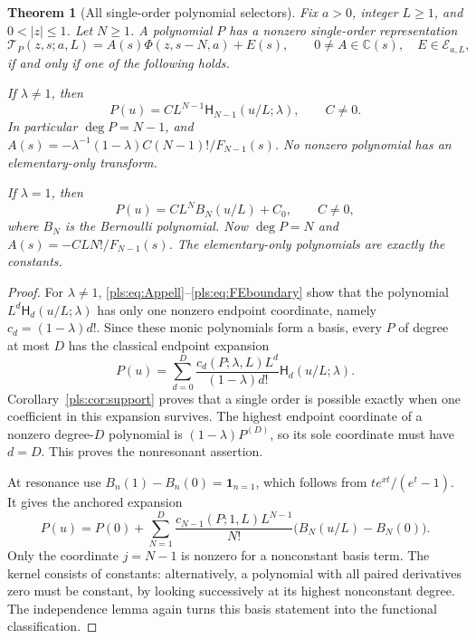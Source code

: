 \documentclass[11pt,letterpaper]{article}
\numberwithin{equation}{section}
\newtheorem{theorem}{Theorem}[section]
\theoremstyle{definition}
\theoremstyle{remark}\newtheorem{remark}[theorem]{Remark}
\newcommand{\C}{\mathbb C}\newcommand{\Q}{\mathbb Q}
\newcommand{\T}{\mathcal T}
\newcommand{\E}{\mathcal E}
\newcommand{\HFE}{\mathsf H}
\begin{document}
\begin{theorem}[All single-order polynomial selectors]
\label{pls:thm:classification}
Fix $a>0$, integer $L\ge1$, and $0<|z|\le1$. Let $N\ge1$.
A polynomial $P$ has a nonzero single-order representation
\begin{equation}\label{pls:eq:singledef}
 \T_P(z,s;a,L)=A(s)\Phi(z,s-N,a)+E(s),
 \qquad 0\ne A\in\C(s),\quad E\in\E_{a,L},
\end{equation}
if and only if one of the following holds.

If $\lambda\ne1$, then
\begin{equation}\label{pls:eq:nonresclass}
 P(u)=C L^{N-1}\HFE_{N-1}(u/L;\lambda),\qquad C\ne0.
\end{equation}
In particular $\deg P=N-1$, and
$A(s)=-\lambda^{-1}(1-\lambda)C(N-1)!/F_{N-1}(s)$.
No nonzero polynomial has an elementary-only transform.

If $\lambda=1$, then
\begin{equation}\label{pls:eq:resclass}
 P(u)=C L^N B_N(u/L)+C_0,\qquad C\ne0,
\end{equation}
where $B_N$ is the Bernoulli polynomial. Now $\deg P=N$ and
$A(s)=-CLN!/F_{N-1}(s)$. The elementary-only polynomials are
exactly the constants.
\end{theorem}
\begin{proof}
For $\lambda\ne1$, \eqref{pls:eq:Appell}--\eqref{pls:eq:FEboundary}
show that the polynomial $L^d\HFE_d(u/L;\lambda)$ has only one
nonzero endpoint coordinate, namely $c_d=(1-\lambda)d!$.
Since these monic polynomials form a basis, every $P$ of degree at
most $D$ has the classical endpoint expansion
\begin{equation}\label{pls:eq:FEbasis}
 P(u)=\sum_{d=0}^D
       \frac{c_d(P;\lambda,L)L^d}{(1-\lambda)d!}
                         \HFE_d(u/L;\lambda).
\end{equation}
Corollary~\ref{pls:cor:support} proves that a single order is
possible exactly when one coefficient in this expansion survives.
The highest endpoint coordinate of a nonzero degree-$D$ polynomial
is $(1-\lambda)P^{(D)}$, so its sole coordinate must have $d=D$.
This proves the nonresonant assertion.

At resonance use
$B_n(1)-B_n(0)=\mathbf1_{n=1}$, which follows from
$te^{xt}/(e^t-1)$. It gives the anchored expansion
\begin{equation}\label{pls:eq:Bbasis}
 P(u)=P(0)+\sum_{N=1}^D
 \frac{c_{N-1}(P;1,L)L^{N-1}}{N!}
                      \bigl(B_N(u/L)-B_N(0)\bigr).
\end{equation}
Only the coordinate $j=N-1$ is nonzero for a nonconstant basis term.
The kernel consists of constants: alternatively, a polynomial with
all paired derivatives zero must be constant, by looking successively
at its highest nonconstant degree. The independence lemma again
turns this basis statement into the functional classification.
\end{proof}
\end{document}
